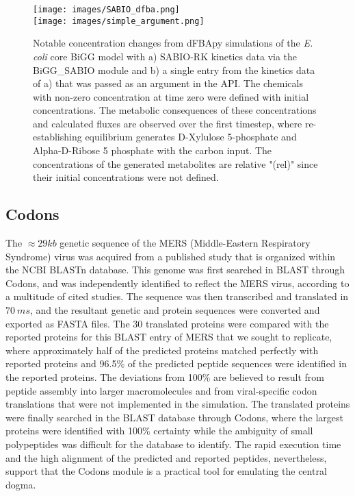 \begin{figure}
    \centering
    \texttt{[image: images/SABIO\_dfba.png]} \\
    \texttt{[image: images/simple\_argument.png]}
    \caption{
        Notable concentration changes from dFBApy simulations of the \textit{E. coli} core BiGG model with a) SABIO-RK kinetics data via the BiGG\_SABIO module and b) a single entry from the kinetics data of a) that was passed as an argument in the API. The chemicals with non-zero concentration at time zero were defined with initial concentrations. The metabolic consequences of these concentrations and calculated fluxes are observed over the first timestep, where re-establishing equilibrium generates D-Xylulose 5-phosphate and Alpha-D-Ribose 5 phosphate with the carbon input. The concentrations of the generated metabolites are relative "(rel)" since their initial concentrations were not defined.
    }
    \label{dfba}
\end{figure}

\subsection{Codons}
The $\approx 29kb$ genetic sequence of the MERS (Middle-Eastern Respiratory Syndrome) virus was acquired from a published study \cite{Enouf2013MiddleGenome} that is organized within the NCBI BLASTn database. This genome was first searched in BLAST through Codons, and was independently identified to reflect the MERS virus, according to a multitude of cited studies. The sequence was then transcribed and translated in $70~ms$, and the resultant genetic and protein sequences were converted and exported as FASTA files. The 30 translated proteins were compared with the reported proteins for this BLAST entry of MERS that we sought to replicate, where approximately half of the predicted proteins matched perfectly with reported proteins and 96.5\% of the predicted peptide sequences were identified in the reported proteins. The deviations from 100\% are believed to result from peptide assembly into larger macromolecules and from viral-specific codon translations that were not implemented in the simulation. The translated proteins were finally searched in the BLAST database through Codons, where the largest proteins were identified with 100\% certainty while the ambiguity of small polypeptides was difficult for the database to identify. The rapid execution time and the high alignment of the predicted and reported peptides, nevertheless, support that the Codons module is a practical tool for emulating the central dogma. 

